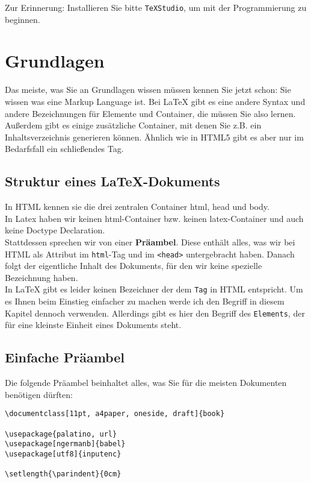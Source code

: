 Zur Erinnerung: Installieren Sie bitte \verb|TeXStudio|, um mit der Programmierung zu beginnen.

\section{Grundlagen}

Das meiste, was Sie an Grundlagen wissen müssen kennen Sie jetzt schon: Sie wissen was eine Markup Language ist. Bei LaTeX gibt es eine andere Syntax und andere Bezeichnungen für Elemente und Container, die müssen Sie also lernen. Außerdem gibt es einige zusätzliche Container, mit denen Sie z.B. ein Inhaltsverzeichnis generieren können. Ähnlich wie in HTML5 gibt es aber nur im Bedarfsfall ein schließendes Tag.\\

\subsection{Struktur eines LaTeX-Dokuments}

In HTML kennen sie die drei zentralen Container html, head und body.\\

In Latex haben wir keinen html-Container bzw. keinen latex-Container und auch keine Doctype Declaration.\\

Stattdessen sprechen wir von einer \textbf{Präambel}. Diese enthält alles, was wir bei HTML als Attribut im \verb|html|-Tag und im \verb|<head>| untergebracht haben. Danach folgt der eigentliche Inhalt des Dokuments, für den wir keine spezielle Bezeichnung haben.\\

In LaTeX gibt es leider keinen Bezeichner der dem \verb|Tag| in HTML entspricht. Um es Ihnen beim Einstieg einfacher zu machen werde ich den Begriff in diesem Kapitel dennoch verwenden. Allerdings gibt es hier den Begriff des \verb|Elements|, der für eine kleinste Einheit eines Dokuments steht.

\subsection{Einfache Präambel}

Die folgende Präambel beinhaltet alles, was Sie für die meisten Dokumenten benötigen dürften:

\begin{verbatim}
\documentclass[11pt, a4paper, oneside, draft]{book}

\usepackage{palatino, url}
\usepackage[ngermanb]{babel}
\usepackage[utf8]{inputenc}

\setlength{\parindent}{0cm}
\end{verbatim}

